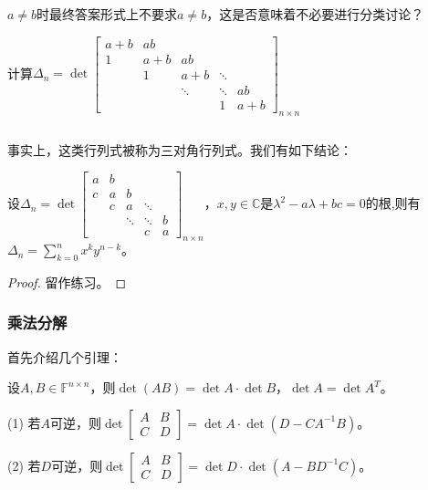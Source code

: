                 \begin{note}
                    $a\neq b$时最终答案形式上不要求$a\neq b$，这是否意味着不必要进行分类讨论？
                \end{note}

                \begin{exercise}
                    计算$\Delta_n=\det\begin{bmatrix}a+b&ab\\1&a+b&ab\\&1&a+b&\ddots\\&&\ddots&\ddots&ab\\&&&1&a+b\end{bmatrix}_{n\times n}$
                \end{exercise}

                $ $

                事实上，这类行列式被称为三对角行列式。我们有如下结论：

                \begin{proposition}
                    设$\Delta_n=\det\begin{bmatrix}a&b\\c&a&b\\&c&a&\ddots\\&&\ddots&\ddots&b\\&&&c&a\end{bmatrix}_{n\times n}$，$x,y\in\mathbb{C}$是$\lambda^2-a\lambda+bc=0$的根,则有$\Delta_n=\sum\limits_{k=0}^n x^k y^{n-k}$。
                \end{proposition}

                \begin{proof}
                    留作练习。
                \end{proof}

            \subsubsection{乘法分解}

                首先介绍几个引理：

                \begin{lemma}
                    \label{determinant_lemma1}
                    设$A,B\in\mathbb{F}^{n\times n}$，则$\det(AB)=\det A\cdot\det B$，$\det A=\det A^T$。
                \end{lemma}

                \begin{lemma}
                    \label{determinant_lemma2}
                    (1) 若$A$可逆，则$\det\begin{bmatrix}A&B \\C&D\end{bmatrix}=\det A\cdot\det(D-CA^{-1}B)$。

                    (2) 若$D$可逆，则$\det\begin{bmatrix}A&B \\C&D\end{bmatrix}=\det D\cdot\det(A-BD^{-1}C)$。
                \end{lemma}

